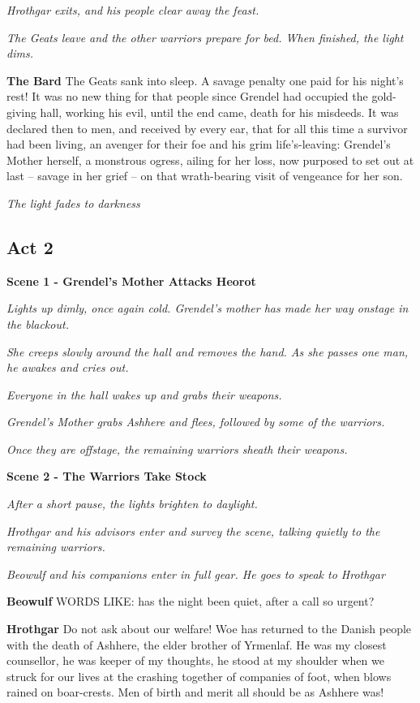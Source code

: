 \documentclass[a4paper]{article}
\begin{document}
{\centerline{\textit{Hrothgar exits, and his people clear away the feast.}}
\centerline{\textit{The Geats leave and the other warriors prepare for bed. When finished, the light dims.}}

\textbf{The Bard} The Geats sank into sleep. A savage penalty
one paid for his night’s rest! It was no new thing for that people
since Grendel had occupied the gold-giving hall,
working his evil, until the end came,
death for his misdeeds. It was declared then to men,
and received by every ear, that for all this time
a survivor had been living, an avenger for their foe
and his grim life’s-leaving: Grendel’s Mother herself,
a monstrous ogress, ailing for her loss,
now purposed to set out at last – savage in her grief –
on that wrath-bearing visit of vengeance for her son.

\centerline{\textit{The light fades to darkness}}

\subsection{Act 2}%

\centerline{\textbf{Scene 1 - Grendel's Mother Attacks Heorot}}
\centerline{\textit{Lights up dimly, once again cold. Grendel's mother has made her way onstage in the blackout.}}
\centerline{\textit{She creeps slowly around the hall and removes the hand. As she passes one man, he awakes and cries out.}}
\centerline{\textit{Everyone in the hall wakes up and grabs their weapons.}}
\centerline{\textit{Grendel's Mother grabs Ashhere and flees, followed by some of the warriors.}}
\centerline{\textit{Once they are offstage, the remaining warriors sheath their weapons.}}

\centerline{\textbf{Scene 2 - The Warriors Take Stock}}
\centerline{\textit{After a short pause, the lights brighten to daylight.}}
\centerline{\textit{Hrothgar and his advisors enter and survey the scene, talking quietly to the remaining warriors.}}
\centerline{\textit{Beowulf and his companions enter in full gear. He goes to speak to Hrothgar}}

\textbf{Beowulf} WORDS LIKE: has the night been quiet, after a call so urgent?

\textbf{Hrothgar} Do not ask about our welfare! Woe has returned
to the Danish people with the death of Ashhere,
the elder brother of Yrmenlaf.
He was my closest counsellor, he was keeper of my thoughts,
he stood at my shoulder when we struck for our lives
at the crashing together of companies of foot,
when blows rained on boar-crests. Men of birth and merit
all should be as Ashhere was!

}
\end{document}
